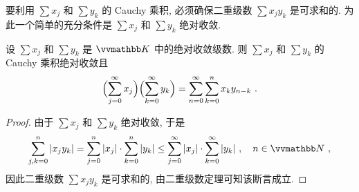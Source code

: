 要利用 \(\sum x_j\) 和 \(\sum y_k\) 的 Cauchy 乘积, 必须确保二重级数 \(\sum x_j y_k\) 是可求和的. 为此一个简单的充分条件是 \(\sum x_j\) 和 \(\sum y_k\) 绝对收敛.

\begin{theorem}
    设 \(\sum x_j\) 和 \(\sum y_k\) 是 \(\K\) 中的绝对收敛级数. 则 \(\sum x_j\) 和 \(\sum y_k\) 的 Cauchy 乘积绝对收敛且
    \[
        \Bigl(\sum_{j = 0}^\infty x_j\Bigr) \Bigl(\sum_{k = 0}^\infty y_k\Bigr) = \sum_{n = 0}^\infty \sum_{k = 0}^n x_k y_{n - k}\ .
    \]
\end{theorem}

\begin{proof}
    由于 \(\sum x_j\) 和 \(\sum y_k\) 绝对收敛, 于是
    \[
        \sum_{j, k = 0}^n |x_j y_k| = \sum_{j = 0}^n |x_j| \cdot \sum_{k = 0}^n |y_k| \leq \sum_{j = 0}^\infty |x_j| \cdot \sum_{k = 0}^\infty |y_k|\ ,\quad n \in \N\ ,
    \]
    因此二重级数 \(\sum x_j y_k\) 是可求和的, 由二重级数定理可知该断言成立.
\end{proof}

